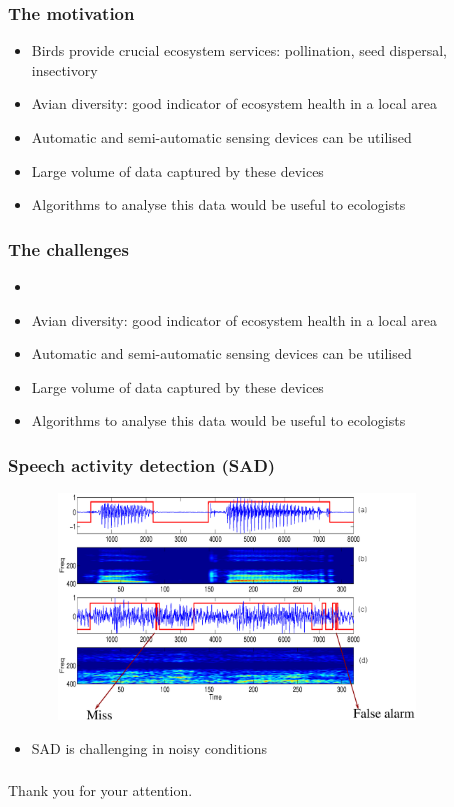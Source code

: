 \documentclass[mathserif]{beamer}
\begin{document}
\begin{frame}
\frametitle{The motivation}
\begin{itemize}
\item<2-> Birds provide crucial ecosystem services: pollination, seed dispersal,
insectivory
\item<3-> Avian diversity: good indicator of ecosystem health in a local area
\item<4-> Automatic and semi-automatic sensing devices can be utilised
\item<5-> Large volume of data captured by these devices
\item<6-> Algorithms to analyse this data would be useful to ecologists
\end{itemize}
\end{frame}

\begin{frame}
\frametitle{The challenges}
\begin{itemize}
\item<2-> 
\item<3-> Avian diversity: good indicator of ecosystem health in a local area
\item<4-> Automatic and semi-automatic sensing devices can be utilised
\item<5-> Large volume of data captured by these devices
\item<6-> Algorithms to analyse this data would be useful to ecologists
\end{itemize}
\end{frame}




\begin{frame}
\frametitle{Speech activity detection (SAD)}
\begin{figure}[t12]
\centering
\includegraphics[width=10cm,height=6cm]{figures/vad_miss_fa.eps}
\end{figure}
\begin{itemize}
	\item SAD is challenging in noisy conditions
\end{itemize}
\end{frame}



\begin{frame}
\frametitle{}
\Large{Thank you for your attention.}
\end{frame}
\end{document}
